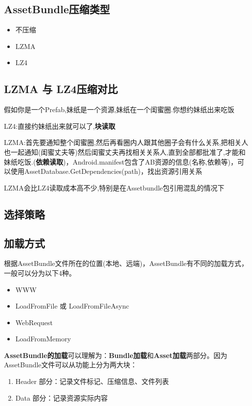 \documentclass[UTF8,a4paper,12pt]{ctexbook}
\begin{document}
		\subsection{AssetBundle压缩类型}
			\begin{itemize}
				\item 不压缩
				\item LZMA
				\item LZ4
			\end{itemize}	
			
			\subsection{LZMA 与 LZ4压缩对比}
				假如你是一个Prefab,妹纸是一个资源,妹纸在一个闺蜜圈.你想约妹纸出来吃饭
			
				LZ4:直接约妹纸出来就可以了,\textbf{块读取}
			
				LZMA:首先要通知整个闺蜜圈,然后再看圈内人跟其他圈子会有什么关系,把相关人也一起通知(闺蜜丈夫等)然后闺蜜丈夫再找相关关系人,直到全部都批准了,才能和妹纸吃饭.(\textbf{依赖读取})，Android.manifest包含了AB资源的信息(名称,依赖等)，可以使用AssetDatabase.GetDependencies(path)，找出资源引用关系
				

				LZMA会比LZ4读取成本高不少,特别是在Assetbundle包引用混乱的情况下
				
				
			\subsection{选择策略}
				
				
		\subsection{加载方式}   
			根据AssetBundle文件所在的位置(本地、远端)，AssetBundle有不同的加载方式，一般可以分为以下4种。
			\begin{itemize}
				\item WWW
				\item LoadFromFile 或 LoadFromFileAsync
				\item WebRequest
				\item LoadFromMemory
			\end{itemize} 
			
			\textbf{AssetBundle的加载}可以理解为：\textbf{Bundle加载}和\textbf{Asset加载}两部分。因为AssetBundle文件可以从功能上分为两大块：
			\begin{enumerate}
				\item Header 部分：记录文件标记、压缩信息、文件列表
				\item Data 部分：记录资源实际内容
			\end{enumerate}
			
\end{document}
